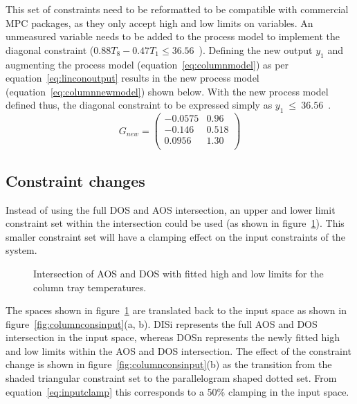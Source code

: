 \documentclass[final,authoryear,5pt,times,twocolumn]{elsarticle}
\newcommand{\bpm}{\begin{pmatrix}} %
\newcommand{\epm}{\end{pmatrix}}
\begin{document}
This set of constraints need to be reformatted to be compatible with commercial MPC packages, as they only accept high and low limits on variables.
An unmeasured variable needs to be added to the process model to implement the diagonal constraint ($0.88T_8-0.47T_1\leq 36.56$~\textcelsius).
Defining the new output $y_1$ and augmenting the process model (equation~\ref{eq:columnmodel}) as per equation~\ref{eq:linconoutput} results in the new process model (equation~\ref{eq:columnnewmodel}) shown below. With the new process model defined thus, the diagonal constraint to be expressed simply as {$y_1~\leq~36.56$~\textcelsius}.
\begin{equation}
  \label{eq:columnnewmodel}
  G_{new}= \bpm -0.0575 & 0.96 \\       %
                  -0.146  & 0.518 \\      %
                   0.0956 & 1.30 \\ \epm  %
\end{equation}


\subsection{Constraint changes}
Instead of using the full DOS and AOS intersection, an upper and lower limit constraint set within the intersection could be used (as shown in figure~\ref{fig:columnfitbox}).
This smaller constraint set will have a clamping effect on the input constraints of the system.

\begin{figure}[htbp]
  \centering
    \scalebox{1}{}
  \caption[Fitted constraints for the laboratory distillation column]{Intersection of AOS and DOS with fitted high and low limits for the column tray temperatures.}
  \label{fig:columnfitbox}
\end{figure}

The spaces shown in figure~\ref{fig:columnfitbox} are translated back to the input space as shown in figure~\ref{fig:columnconsinput}(a, b).
DISi represents the full AOS and DOS intersection in the input space, whereas DOSn represents the newly fitted high and low limits within the AOS and DOS intersection.
The effect of the constraint change is shown in figure~\ref{fig:columnconsinput}(b) as the transition from the shaded triangular constraint set to the parallelogram shaped dotted set.
From equation~\ref{eq:inputclamp} this corresponds to a 50\% clamping in the input space.
\end{document}
